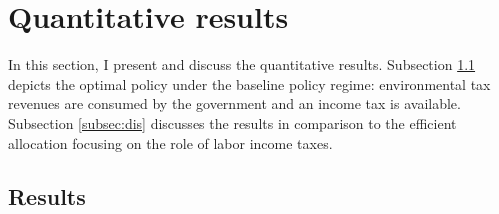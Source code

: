 \section{Quantitative results}\label{sec:res}

In this section, I present and discuss the quantitative results.
Subsection \ref{subsec:mr} depicts the optimal policy under the baseline policy regime: environmental tax revenues are consumed by the government and an income tax is available. Subsection \ref{subsec:dis} discusses the results in comparison to the efficient allocation focusing on the role of labor income taxes.


\subsection{Results}\label{subsec:mr}

